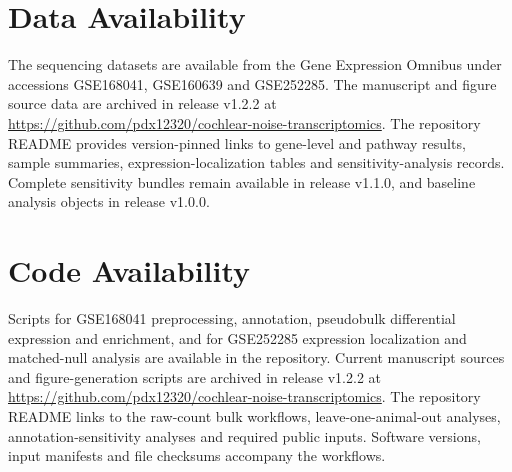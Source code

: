 \section*{Data Availability}
The sequencing datasets are available from the Gene Expression Omnibus under accessions GSE168041, GSE160639 and GSE252285. The manuscript and figure source data are archived in release v1.2.2 at \url{https://github.com/pdx12320/cochlear-noise-transcriptomics}. The repository README provides version-pinned links to gene-level and pathway results, sample summaries, expression-localization tables and sensitivity-analysis records. Complete sensitivity bundles remain available in release v1.1.0, and baseline analysis objects in release v1.0.0.

\section*{Code Availability}
Scripts for GSE168041 preprocessing, annotation, pseudobulk differential expression and enrichment, and for GSE252285 expression localization and matched-null analysis are available in the repository. Current manuscript sources and figure-generation scripts are archived in release v1.2.2 at \url{https://github.com/pdx12320/cochlear-noise-transcriptomics}. The repository README links to the raw-count bulk workflows, leave-one-animal-out analyses, annotation-sensitivity analyses and required public inputs. Software versions, input manifests and file checksums accompany the workflows.
